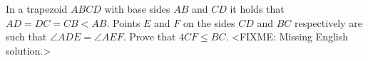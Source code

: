 \problem
In a trapezoid $ABCD$ with base sides $AB$ and $CD$ it holds that
$AD = DC = CB < AB$.
Points $E$ and $F$ on the sides $CD$ and $BC$ respectively are such that
$\angle ADE = \angle AEF$.
Prove that $4 CF \leq BC$.
\solution
<FIXME: Missing English solution.>
\endproblem
